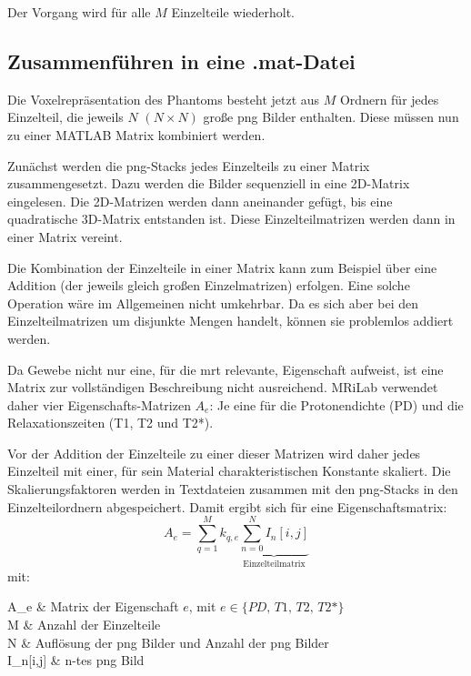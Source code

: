 Der Vorgang wird für alle $M$ Einzelteile wiederholt.

\subsection{Zusammenführen in eine .mat-Datei}
Die Voxelrepräsentation des Phantoms besteht jetzt aus $M$ Ordnern für jedes Einzelteil, die jeweils $N$ $(N \times N)$ große png Bilder enthalten. Diese müssen nun zu einer MATLAB Matrix kombiniert werden.

Zunächst werden die png-Stacks jedes Einzelteils zu einer Matrix zusammengesetzt. Dazu werden die Bilder sequenziell in eine 2D-Matrix eingelesen. Die 2D-Matrizen werden dann aneinander gefügt, bis eine quadratische 3D-Matrix entstanden ist. Diese Einzelteilmatrizen werden dann in einer Matrix vereint.

Die Kombination der Einzelteile in einer Matrix kann zum Beispiel über eine Addition (der jeweils gleich großen Einzelmatrizen) erfolgen. Eine solche Operation wäre im Allgemeinen nicht umkehrbar. Da es sich aber bei den Einzelteilmatrizen um disjunkte Mengen handelt, können sie problemlos addiert werden.

Da Gewebe nicht nur eine, für die \gls{mrt} relevante, Eigenschaft aufweist, ist eine Matrix zur vollständigen Beschreibung nicht ausreichend. MRiLab verwendet daher vier Eigenschafts-Matrizen $A_e$: Je eine für die Protonendichte (PD) und die Relaxationszeiten (T1, T2 und T2*).

Vor der Addition der Einzelteile zu einer dieser Matrizen wird daher jedes Einzelteil mit einer, für sein Material charakteristischen Konstante skaliert. Die Skalierungsfaktoren werden in Textdateien zusammen mit den png-Stacks in den Einzelteilordnern abgespeichert. Damit ergibt sich für eine Eigenschaftsmatrix:
\begin{equation}
\label{eq:sumMatrix}
	A_e=\sum_{q=1}^{M} k_{q,e} \underbrace{\sum_{n=0}^{N} I_n[i,j]}_\text{Einzelteilmatrix}
\end{equation}
mit:
\begin{with*}
	A_e & Matrix der Eigenschaft $e$, mit $e \in \{PD,\, T1,\, T2,\, T2\text{*}\}$ \\
	M & Anzahl der Einzelteile \\
	N & Auflösung der png Bilder und Anzahl der png Bilder \\
	I_n[i,j] & n-tes png Bild \\
\end{with*}

